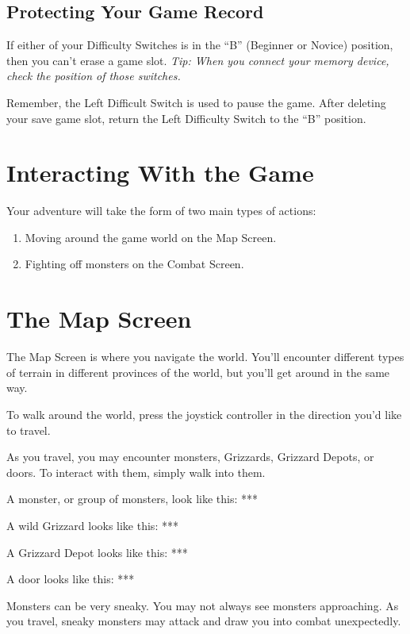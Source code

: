 \documentclass[12pt,openright,book]{memoir}
\begin{document}
\subsection{Protecting Your Game Record}

If  either of  your Difficulty  Switches is  in the  ``B'' (Beginner  or
Novice) position, then you can't erase  a game slot. \emph{Tip: When you
  connect your memory device, check the position of those switches.}

\ifdefined\TVSECAM
Remember,  the  Left  Difficult  Switch  is  used  to  pause  the  game.
After deleting your save game slot, return the Left Difficulty Switch to
the ``B'' position.
\fi

\section{Interacting With the Game}

Your adventure will take the form of two main types of actions:

\begin{enumerate}
\item Moving around the game world on the Map Screen.
\item Fighting off monsters on the Combat Screen.
\end{enumerate}

\section{The Map Screen}

The Map Screen is where you navigate the world.  You'll encounter different
types of terrain in different provinces of the world, but you'll get around
in the same way.

To walk around the world, press the joystick controller in the direction
you'd like to travel.

As you travel,  you may encounter monsters,  Grizzards, Grizzard Depots,
or doors. To interact with them, simply walk into them.

A monster, or group of monsters, look like this: ***

A wild Grizzard looks like this: ***

A Grizzard Depot looks like this: ***

A door looks like this: ***

Monsters  can  be   very  sneaky.  You  may  not   always  see  monsters
approaching. As you travel, sneaky monsters may attack and draw you into
combat unexpectedly.
\end{document}

